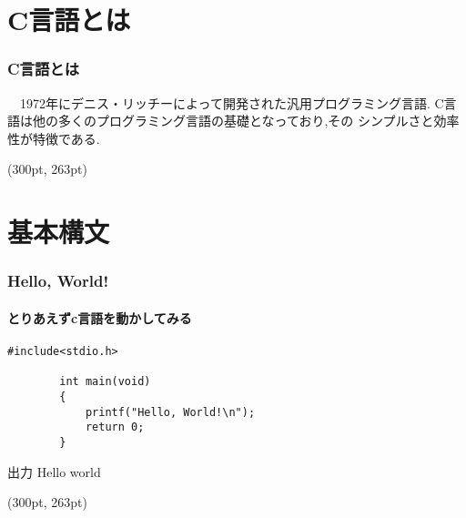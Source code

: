 \documentclass[dvipdfmx]{beamer}
\begin{document}
\section{C言語とは}
\begin{frame}[c, fragile]
    \frametitle{C言語とは}
    　1972年にデニス・リッチーによって開発された汎用プログラミング言語.
    C言語は他の多くのプログラミング言語の基礎となっており,その
    シンプルさと効率性が特徴である.
    \begin{textblock*}{0.3\linewidth}(300pt, 263pt)
    \space
    \end{textblock*}
\end{frame}

\section{基本構文}
\begin{frame}[c, fragile]
    \frametitle{Hello, World!}
    \framesubtitle{とりあえずc言語を動かしてみる}
    \begin{lstlisting}[gobble=8, caption=hello.c, label=hello]
        #include<stdio.h>

        int main(void)
        {
            printf("Hello, World!\n");
            return 0;
        }
    \end{lstlisting}
    \begin{block}{出力}
        Hello world
    \end{block}
    \begin{textblock*}{0.3\linewidth}(300pt, 263pt)
    \space
    \end{textblock*}
\end{frame}
\end{document}
